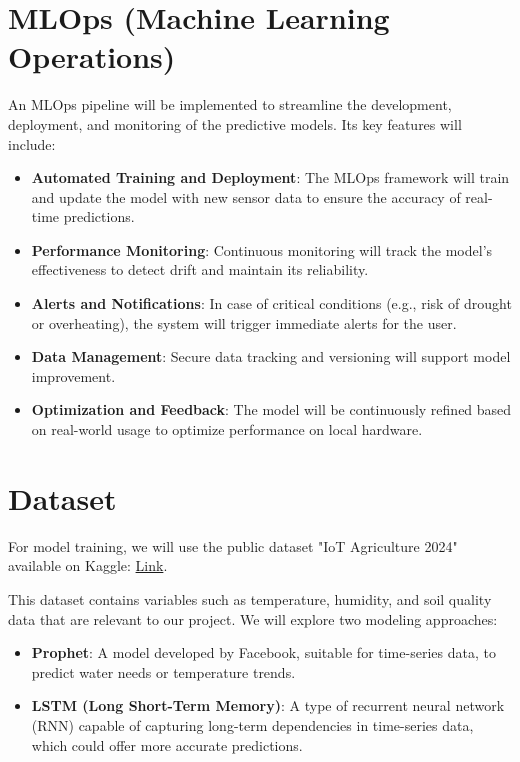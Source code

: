\documentclass{report}
\begin{document}
\section{MLOps (Machine Learning Operations)}
An MLOps pipeline will be implemented to streamline the development, deployment, and monitoring of the predictive models. Its key features will include:
\begin{itemize}
    \item \textbf{Automated Training and Deployment}: The MLOps framework will train and update the model with new sensor data to ensure the accuracy of real-time predictions.
    \item \textbf{Performance Monitoring}: Continuous monitoring will track the model's effectiveness to detect drift and maintain its reliability.
    \item \textbf{Alerts and Notifications}: In case of critical conditions (e.g., risk of drought or overheating), the system will trigger immediate alerts for the user.
    \item \textbf{Data Management}: Secure data tracking and versioning will support model improvement.
    \item \textbf{Optimization and Feedback}: The model will be continuously refined based on real-world usage to optimize performance on local hardware.
\end{itemize}

\section{Dataset}
For model training, we will use the public dataset "IoT Agriculture 2024" available on Kaggle: \href{https://www.kaggle.com/datasets/wisam1985/iot-agriculture-2024/data?select=IoTProcessed_Data.csv}{Link}.

This dataset contains variables such as temperature, humidity, and soil quality data that are relevant to our project. We will explore two modeling approaches:
\begin{itemize}
    \item \textbf{Prophet}: A model developed by Facebook, suitable for time-series data, to predict water needs or temperature trends.
    \item \textbf{LSTM (Long Short-Term Memory)}: A type of recurrent neural network (RNN) capable of capturing long-term dependencies in time-series data, which could offer more accurate predictions.
\end{itemize}
\end{document}
